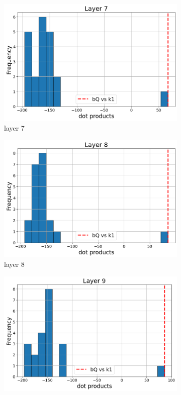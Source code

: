 \documentclass[11pt]{article}
\begin{document}
\begin{figure}[t]
    \begin{subfigure}[t]{0.24\textwidth}
    \centering
    \includegraphics[width=1.4\columnwidth]{figures/obs1_appendix/obs1_layer7.png}
    \caption{layer 7}
  \end{subfigure}\hfill
      \begin{subfigure}[t]{0.24\textwidth}
    \centering
    \includegraphics[width=1.4\columnwidth]{figures/obs1_appendix/obs1_layer8.png}
    \caption{layer 8}
  \end{subfigure}\hfill
      \begin{subfigure}[t]{0.24\textwidth}
    \centering
    \includegraphics[width=1.4\columnwidth]{figures/obs1_appendix/obs1_layer9.png}

\end{subfigure}
\end{figure}
\end{document}
